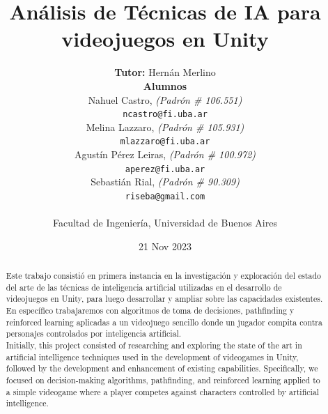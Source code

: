 \documentclass[a4paper]{article}
\begin{document}
\begin{titlepage}

    \title{
        \textbf{Análisis de Técnicas de IA para \\ videojuegos en Unity} \\[2.5ex]
    }

    \author{    
        \textbf{Tutor:} Hernán Merlino \\[2.5ex]
        \textbf{Alumnos} \\[2.5ex]  
        Nahuel Castro, \textit{(Padrón \# 106.551)} \\ \texttt{ ncastro@fi.uba.ar } \\[2.5ex]
        Melina Lazzaro, \textit{(Padrón \# 105.931)} \\ \texttt{ mlazzaro@fi.uba.ar } \\[2.5ex]
        Agustín Pérez Leiras, \textit{(Padrón \# 100.972)} \\ \texttt{ aperez@fi.uba.ar } \\[2.5ex]
        Sebastián Rial, \textit{(Padrón \# 90.309)} \\  \texttt{ riseba@gmail.com } \\[2.5ex]
        \\[2.5ex]
        \normalsize{Facultad de Ingeniería, Universidad de Buenos Aires} \\
    }
    
    \date{21 Nov 2023}
    
\end{titlepage}

\maketitle

\newpage

\begin{abstract}

    Este trabajo consistió en primera instancia en la investigación y exploración del estado del arte de las técnicas de inteligencia artificial utilizadas en el desarrollo de videojuegos en Unity, para luego desarrollar y ampliar sobre las capacidades existentes. En específico trabajaremos con algoritmos de toma de decisiones, pathfinding y reinforced learning aplicadas a un videojuego sencillo donde un jugador compita contra personajes controlados por inteligencia artificial.\\

    Initially, this project consisted of researching and exploring the state of the art in artificial intelligence techniques used in the development of videogames in Unity, followed by the development and enhancement of existing capabilities. Specifically, we focused on decision-making algorithms, pathfinding, and reinforced learning applied to a simple videogame where a player competes against characters controlled by artificial intelligence.

\end{abstract}
\end{document}
